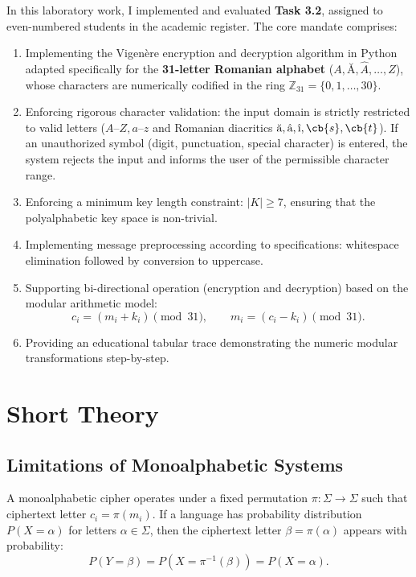 \documentclass[11pt,a4paper]{article}
\begin{document}
In this laboratory work, I implemented and evaluated \textbf{Task 3.2}, assigned to even-numbered students in the academic register. The core mandate comprises:
\begin{enumerate}
  \item Implementing the Vigen\`ere encryption and decryption algorithm in Python adapted specifically for the \textbf{31-letter Romanian alphabet} ($A, \text{\u{A}}, \hat{A}, \dots, Z$), whose characters are numerically codified in the ring $\mathbb{Z}_{31} = \{0, 1, \dots, 30\}$.
  \item Enforcing rigorous character validation: the input domain is strictly restricted to valid letters ($A\text{--}Z, a\text{--}z$ and Romanian diacritics $\text{\u{a}}, \hat{\text{a}}, \hat{\text{\i}}, \cb{s}, \cb{t}$). If an unauthorized symbol (digit, punctuation, special character) is entered, the system rejects the input and informs the user of the permissible character range.
  \item Enforcing a minimum key length constraint: $|K| \ge 7$, ensuring that the polyalphabetic key space is non-trivial.
  \item Implementing message preprocessing according to specifications: whitespace elimination followed by conversion to uppercase.
  \item Supporting bi-directional operation (encryption and decryption) based on the modular arithmetic model:
  \begin{equation}
    c_i = (m_i + k_i) \pmod{31}, \qquad m_i = (c_i - k_i) \pmod{31}.
  \end{equation}
  \item Providing an educational tabular trace demonstrating the numeric modular transformations step-by-step.
\end{enumerate}

\newpage
\section{Short Theory}

\subsection{Limitations of Monoalphabetic Systems}

A monoalphabetic cipher operates under a fixed permutation $\pi: \Sigma \to \Sigma$ such that ciphertext letter $c_i = \pi(m_i)$. If a language has probability distribution $P(X = \alpha)$ for letters $\alpha \in \Sigma$, then the ciphertext letter $\beta = \pi(\alpha)$ appears with probability:
\begin{equation}
  P(Y = \beta) = P(X = \pi^{-1}(\beta)) = P(X = \alpha).
\end{equation}
\end{document}
